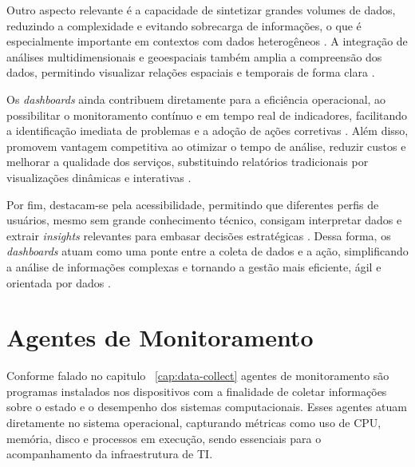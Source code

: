 \documentclass[
    12pt
    ,oneside
    ,a4paper
    ,chapter=TITLE
    ,section=TITLE
    ,sumario=abnt-6027-2012]{abntex2}
\begin{document}
Outro aspecto relevante é a capacidade de sintetizar grandes volumes de dados, reduzindo a complexidade e evitando sobrecarga de informações, o que é especialmente importante em contextos com dados heterogêneos \cite{rolim2020}. A integração de análises multidimensionais e geoespaciais também amplia a compreensão dos dados, permitindo visualizar relações espaciais e temporais de forma clara \cite{ufms2024}.

Os \textit{dashboards} ainda contribuem diretamente para a eficiência operacional, ao possibilitar o monitoramento contínuo e em tempo real de indicadores, facilitando a identificação imediata de problemas e a adoção de ações corretivas \cite{ufms2024}. Além disso, promovem vantagem competitiva ao otimizar o tempo de análise, reduzir custos e melhorar a qualidade dos serviços, substituindo relatórios tradicionais por visualizações dinâmicas e interativas \cite{rolim2020}.

Por fim, destacam-se pela acessibilidade, permitindo que diferentes perfis de usuários, mesmo sem grande conhecimento técnico, consigam interpretar dados e extrair \textit{insights} relevantes para embasar decisões estratégicas \cite{ufms2024}. Dessa forma, os \textit{dashboards} atuam como uma ponte entre a coleta de dados e a ação, simplificando a análise de informações complexas e tornando a gestão mais eficiente, ágil e orientada por dados \cite{campos2023}.


\chapter{Agentes de Monitoramento}
\label{cap:agents}

Conforme falado no capitulo ~\ref{cap:data-collect} agentes de monitoramento são programas instalados nos dispositivos com a finalidade de coletar informações sobre o estado e o desempenho dos sistemas computacionais. Esses agentes atuam diretamente no sistema operacional, capturando métricas como uso de CPU, memória, disco e processos em execução, sendo essenciais para o acompanhamento da infraestrutura de TI.
\end{document}
